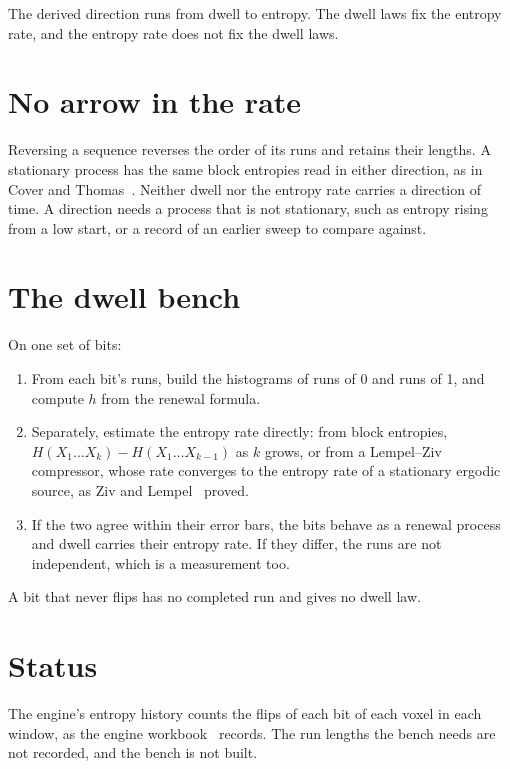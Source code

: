 The derived direction runs from dwell to entropy. The dwell laws fix the entropy rate, and the entropy rate does not fix the dwell laws.

\section{\texorpdfstring{No arrow in the rate}{No arrow in the rate}}

Reversing a sequence reverses the order of its runs and retains their lengths. A stationary process has the same block entropies read in either direction, as in Cover and Thomas~\cite{src:Cover-Thomas-2006}. Neither dwell nor the entropy rate carries a direction of time. A direction needs a process that is not stationary, such as entropy rising from a low start, or a record of an earlier sweep to compare against.

\section{\texorpdfstring{The dwell bench}{The dwell bench}}

On one set of bits:

\begin{enumerate}
\item From each bit's runs, build the histograms of runs of 0 and runs of 1, and compute \(h\) from the renewal formula.
\item Separately, estimate the entropy rate directly: from block entropies, \(H(X_1 \ldots X_k) - H(X_1 \ldots X_{k-1})\) as \(k\) grows, or from a Lempel–Ziv compressor, whose rate converges to the entropy rate of a stationary ergodic source, as Ziv and Lempel~\cite{src:Ziv-Lempel-1978} proved.
\item If the two agree within their error bars, the bits behave as a renewal process and dwell carries their entropy rate. If they differ, the runs are not independent, which is a measurement too.
\end{enumerate}

A bit that never flips has no completed run and gives no dwell law.

\section{\texorpdfstring{Status}{Status}}

The engine's entropy history counts the flips of each bit of each voxel in each window, as the engine workbook~\cite{src:Quigg-engine-workbook} records. The run lengths the bench needs are not recorded, and the bench is not built.
